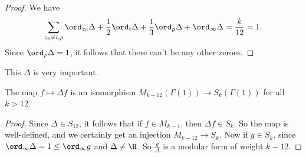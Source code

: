\documentclass[a4paper]{article}
\begin{document}
\begin{proof}
  We have
  \[
    \sum_{z_0 \not= i, \rho} \ord_{z_0} \Delta + \frac{1}{2} \ord_i \Delta + \frac{1}{3} \ord_\rho \Delta + \ord_\infty \Delta = \frac{k}{12} = 1.
  \]
  Since $\ord_\rho \Delta = 1$, it follows that there can't be any other zeroes.
\end{proof}

This $\Delta$ is very important.
\begin{prop}
  The map $f \mapsto \Delta f$ is an isomorphism $M_{k - 12}(\Gamma(1)) \to S_k(\Gamma(1))$ for all $k > 12$.
\end{prop}

\begin{proof}
  Since $\Delta \in S_{12}$, it follows that if $f \in M_{k - 1}$, then $\Delta f \in S_k$. So the map is well-defined, and we certainly get an injection $M_{k - 12} \to S_k$. Now if $g \in S_k$, since $\ord_\infty \Delta = 1 \leq \ord_\infty g$ and $\Delta \not= \H$. So $\frac{g}{\Delta}$ is a modular form of weight $k - 12$.
\end{proof}
\end{document}
